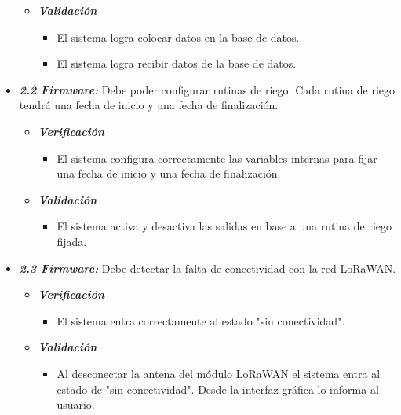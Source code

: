 \documentclass[11pt]{charter}
\begin{document}
\begin{itemize}
\begin{itemize}
		\item \textit{\textbf{Validación}}
		\begin{itemize}
			\item El sistema logra colocar datos en la base de datos.
			\item El sistema logra recibir datos de la base de datos.
		\end{itemize}
	\end{itemize}
	
	\item \textit{\textbf{2.2 Firmware:}} Debe poder configurar rutinas de riego. Cada rutina de riego tendrá una fecha de inicio y una fecha de finalización.
	\begin{itemize}
		\item \textit{ \textbf{Verificación}}
		\begin{itemize}
			\item El sistema configura correctamente las variables internas para fijar una fecha de inicio y una fecha de finalización.
		\end{itemize}
		
		\item \textit{\textbf{Validación}}
		\begin{itemize}
			\item El sistema activa y desactiva las salidas en base a una rutina de riego fijada.
		\end{itemize}
	\end{itemize}

\clearpage
	
	\item \textit{\textbf{2.3 Firmware:}} Debe detectar la falta de conectividad con la red LoRaWAN.
	\begin{itemize}
		\item \textit{ \textbf{Verificación}}
		\begin{itemize}
			\item El sistema entra correctamente al estado "sin conectividad".
		\end{itemize}
		
		\item \textit{\textbf{Validación}}
		\begin{itemize}
			\item Al desconectar la antena del módulo LoRaWAN el sistema entra al estado de "sin conectividad". Desde la interfaz gráfica lo informa al usuario.
		\end{itemize}					
	\end{itemize}
	

\end{itemize}
\end{document}
